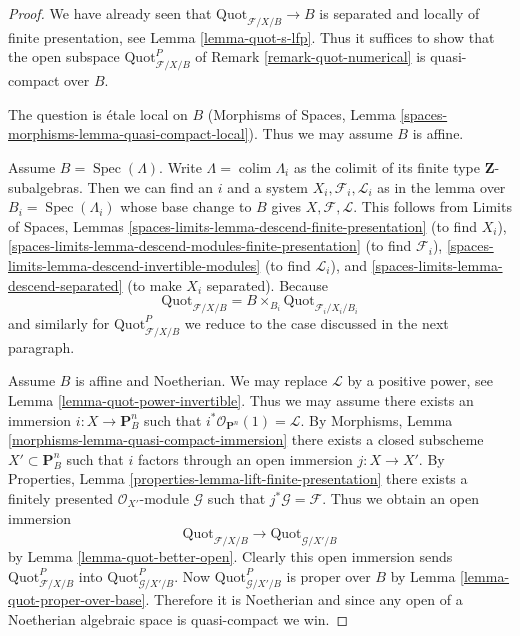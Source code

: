 \documentclass[10pt,a4paper]{amsart}
\theoremstyle{plain}
\theoremstyle{definition}
\theoremstyle{remark}
\numberwithin{equation}{subsection}
\def\colim{\mathop{\mathrm{colim}}\nolimits}
\def\Spec{\mathop{\mathrm{Spec}}}
\def\Quotfunctor{\mathrm{Quot}}
\begin{document}
\begin{proof}
We have already seen that $\Quotfunctor_{\mathcal{F}/X/B} \to B$
is separated and locally of finite presentation, see
Lemma \ref{lemma-quot-s-lfp}. Thus it suffices to show that
the open subspace $\Quotfunctor^P_{\mathcal{F}/X/B}$
of Remark \ref{remark-quot-numerical} is quasi-compact over $B$.

\medskip\noindent
The question is \'etale local on $B$
(Morphisms of Spaces, Lemma \ref{spaces-morphisms-lemma-quasi-compact-local}).
Thus we may assume $B$ is affine.

\medskip\noindent
Assume $B = \Spec(\Lambda)$. Write $\Lambda = \colim \Lambda_i$ as the
colimit of its finite type $\mathbf{Z}$-subalgebras. Then
we can find an $i$ and a system $X_i, \mathcal{F}_i, \mathcal{L}_i$
as in the lemma over $B_i = \Spec(\Lambda_i)$ whose base change to
$B$ gives $X, \mathcal{F}, \mathcal{L}$.
This follows from
Limits of Spaces, Lemmas
\ref{spaces-limits-lemma-descend-finite-presentation} (to find $X_i$),
\ref{spaces-limits-lemma-descend-modules-finite-presentation} (to find
$\mathcal{F}_i$), \ref{spaces-limits-lemma-descend-invertible-modules}
(to find $\mathcal{L}_i$), and \ref{spaces-limits-lemma-descend-separated}
(to make $X_i$ separated). Because
$$
\Quotfunctor_{\mathcal{F}/X/B} = B \times_{B_i}
\Quotfunctor_{\mathcal{F}_i/X_i/B_i}
$$
and similarly for $\Quotfunctor^P_{\mathcal{F}/X/B}$ we reduce
to the case discussed in the next paragraph.

\medskip\noindent
Assume $B$ is affine and Noetherian. We may replace $\mathcal{L}$
by a positive power, see Lemma \ref{lemma-quot-power-invertible}.
Thus we may assume there exists an immersion $i : X \to \mathbf{P}^n_B$
such that $i^*\mathcal{O}_{\mathbf{P}^n}(1) = \mathcal{L}$. By
Morphisms, Lemma \ref{morphisms-lemma-quasi-compact-immersion}
there exists a closed subscheme $X' \subset \mathbf{P}^n_B$
such that $i$ factors through an open immersion $j : X \to X'$.
By Properties, Lemma \ref{properties-lemma-lift-finite-presentation}
there exists a finitely presented $\mathcal{O}_{X'}$-module
$\mathcal{G}$ such that $j^*\mathcal{G} = \mathcal{F}$.
Thus we obtain an open immersion
$$
\Quotfunctor_{\mathcal{F}/X/B}
\longrightarrow
\Quotfunctor_{\mathcal{G}/X'/B}
$$
by Lemma \ref{lemma-quot-better-open}. Clearly this open immersion
sends $\Quotfunctor^P_{\mathcal{F}/X/B}$ into
$\Quotfunctor^P_{\mathcal{G}/X'/B}$. Now
$\Quotfunctor^P_{\mathcal{G}/X'/B}$ is proper over $B$ by
Lemma \ref{lemma-quot-proper-over-base}.
Therefore it is Noetherian and since any open of a Noetherian
algebraic space is quasi-compact we win.
\end{proof}
\end{document}
